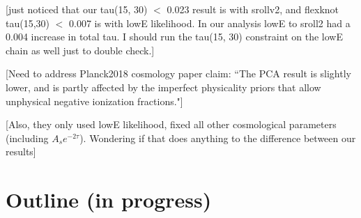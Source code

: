 \documentclass[prd,twocolumn,amsmath,amssymb,floatfix,superscriptaddress,nofootinbib]{revtex4-1}
\begin{document}
[just noticed that our tau(15, 30) $<$ 0.023 result is with srollv2, and flexknot tau(15,30) $<$ 0.007 is with lowE likelihood. In our analysis lowE to sroll2 had a 0.004 increase in total tau. I should run the tau(15, 30) constraint on the lowE chain as well just to double check.]

[Need to address Planck2018 cosmology paper claim: ``The PCA result is slightly lower, and is partly affected by the imperfect physicality priors that allow unphysical negative ionization fractions."]

[Also, they only used lowE likelihood, fixed all other cosmological parameters (including $A_s e^{-2\tau}$). Wondering if that does anything to the difference between our results]



\section{Outline (in progress)}
\end{document}
